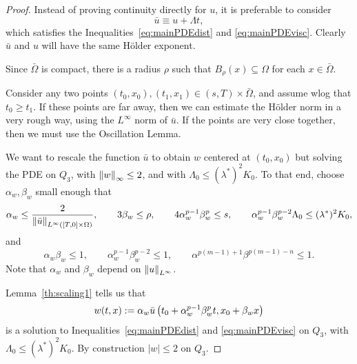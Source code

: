 \begin{proof}
Instead of proving continuity directly for $u$, it is preferable to consider
\[ \bar{u} \equiv u + \Lambda t,\]
which satisfies the Inequalities~\eqref{eq:mainPDEdist} and \eqref{eq:mainPDEvisc}.  Clearly $\bar{u}$ and $u$ will have the same H\"{o}lder exponent.  

Since $\bar{\Omega}$ is compact, there is a radius $\rho$ such that $B_{\rho}(x) \subseteq \Omega$ for each $x \in \bar{\Omega}$.  


Consider any two points $(t_0,x_0), (t_1,x_1) \in (s,T)\times\bar{\Omega}$, and assume wlog that $t_0 \geq t_1$.  If these points are far away, then we can estimate the H\"{o}lder norm in a very rough way, using the $L^\infty$ norm of $\bar{u}$.  If the points are very close together, then we must use the Oscillation Lemma.  

We want to rescale the function $\bar{u}$ to obtain $w$ centered at $(t_0,x_0)$ but solving the PDE on $Q_3$, with $\left\lVert w\right\rVert_\infty \leq 2$, and with $\Lambda_0 \leq (\lambda^*)^2 K_0$.  To that end, choose $\alpha_w,\beta_w$ small enough that 
\[ \alpha_w \leq \frac{2}{\left\lVert\bar{u}\right\rVert_{L^\infty([T,0]\times \Omega)}}, \qquad 3\beta_w \leq \rho, \qquad 4 \alpha_w^{p-1}\beta_w^p \leq s, \qquad \alpha_w^{p-1} \beta_w^{p-2} \Lambda_0 \leq (\lambda^*)^2 K_0, \]
and
\[\alpha_w\beta_w \leq 1, \qquad \alpha_w^{p-1}\beta_w^{p-2} \leq 1, \qquad \alpha^{p(m-1)+1} \beta^{p(m-1)-n} \leq 1.\]
Note that $\alpha_w$ and $\beta_w$ depend on $\left\lVert u\right\rVert_{L^\infty}$.  

Lemma~\ref{th:scaling1} tells us that
\[ w(t,x) := \alpha_w \bar{u}\left( t_0 + \alpha_w^{p-1}\beta_w^p t, x_0 + \beta_w x \right) \]
is a solution to Inequalities~\eqref{eq:mainPDEdist} and \eqref{eq:mainPDEvisc} on $Q_3$, with $\Lambda_0 \leq (\lambda^\ast)^2 K_0$.  By construction $|w|\leq 2$ on $Q_3$.  %


\end{proof}
